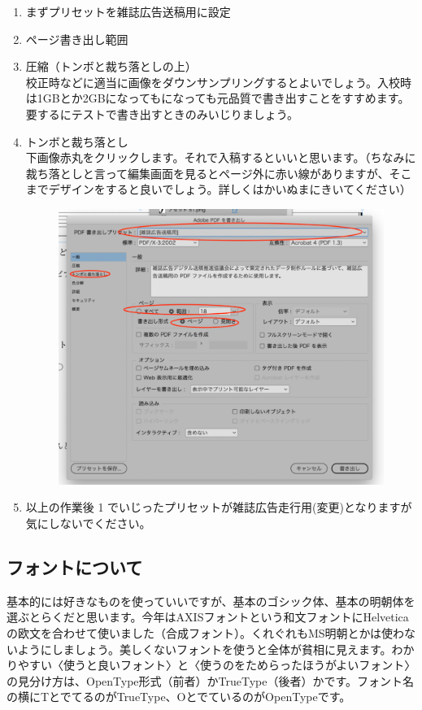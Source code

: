 \documentclass[dvipdfmx,jb5]{jarticle}
\begin{document}
\begin{enumerate}
  \item まずプリセットを雑誌広告送稿用に設定
  \item ページ書き出し範囲
  \item 圧縮（トンボと裁ち落としの上）\\
  校正時などに適当に画像をダウンサンプリングするとよいでしょう。入校時は1GBとか2GBになってもになっても元品質で書き出すことをすすめます。要するにテストで書き出すときのみいじりましょう。
  \item トンボと裁ち落とし\\
  下画像赤丸をクリックします。それで入稿するといいと思います。（ちなみに裁ち落としと言って編集画面を見るとページ外に赤い線がありますが、そこまでデザインをすると良いでしょう。詳しくはかいぬまにきいてください）
  \begin{figure}[H]
    \includegraphics[scale=0.7]{assets/pmh2.png}
  \end{figure}
  \item 以上の作業後 1 でいじったプリセットが雑誌広告走行用(変更)となりますが気にしないでください。
\end{enumerate}

\subsection{フォントについて}
基本的には好きなものを使っていいですが、基本のゴシック体、基本の明朝体を選ぶとらくだと思います。今年はAXISフォントという和文フォントにHelveticaの欧文を合わせて使いました（合成フォント）。くれぐれもMS明朝とかは使わないようにしましょう。美しくないフォントを使うと全体が貧相に見えます。わかりやすい〈使うと良いフォント〉と〈使うのをためらったほうがよいフォント〉の見分け方は、OpenType形式（前者）かTrueType（後者）かです。フォント名の横にTとでてるのがTrueType、OとでているのがOpenTypeです。
\end{document}
